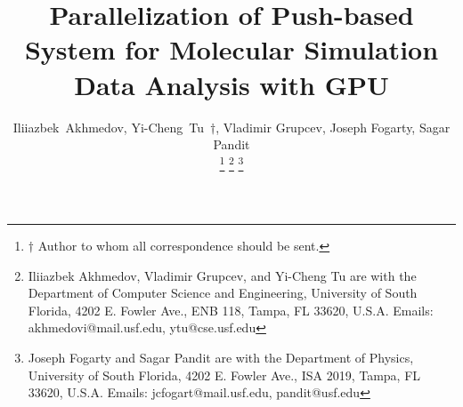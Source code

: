 \documentclass[10pt,journal,final,letterpaper,twocolumn]{IEEEtran}
\begin{document}
\title{Parallelization of Push-based System for Molecular Simulation Data Analysis with GPU}


\author{Iliiazbek~Akhmedov, Yi-Cheng~Tu~$\dagger$, Vladimir Grupcev, Joseph Fogarty, Sagar Pandit %

\thanks{$\dagger$ Author to whom all correspondence should be sent.}
\thanks{Iliiazbek Akhmedov, Vladimir Grupcev, and Yi-Cheng Tu are with the Department of Computer Science and Engineering, University of South Florida, 4202 E. Fowler Ave., ENB 118, Tampa, FL 33620, U.S.A. Emails:
akhmedovi@mail.usf.edu, ytu@cse.usf.edu}
\thanks{Joseph Fogarty and Sagar Pandit are with the Department of Physics,
University of South Florida, 4202 E. Fowler Ave., ISA 2019, Tampa,
FL 33620, U.S.A. Emails: jcfogart@mail.usf.edu, pandit@usf.edu} }



\maketitle
\end{document}
